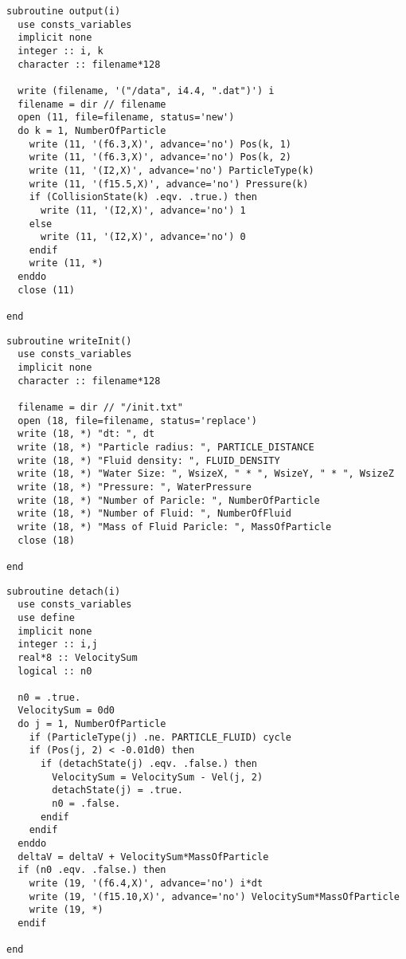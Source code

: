 \begin{lstlisting}[caption=粒子データ出力用ルーチン]
subroutine output(i)
  use consts_variables
  implicit none
  integer :: i, k
  character :: filename*128

  write (filename, '("/data", i4.4, ".dat")') i
  filename = dir // filename
  open (11, file=filename, status='new')
  do k = 1, NumberOfParticle
    write (11, '(f6.3,X)', advance='no') Pos(k, 1)
    write (11, '(f6.3,X)', advance='no') Pos(k, 2)
    write (11, '(I2,X)', advance='no') ParticleType(k)
    write (11, '(f15.5,X)', advance='no') Pressure(k)
    if (CollisionState(k) .eqv. .true.) then
      write (11, '(I2,X)', advance='no') 1
    else
      write (11, '(I2,X)', advance='no') 0
    endif
    write (11, *)
  enddo
  close (11)

end
\end{lstlisting}
\begin{lstlisting}[caption=初期状態出力用ルーチン]
subroutine writeInit()
  use consts_variables
  implicit none
  character :: filename*128

  filename = dir // "/init.txt"
  open (18, file=filename, status='replace')
  write (18, *) "dt: ", dt
  write (18, *) "Particle radius: ", PARTICLE_DISTANCE
  write (18, *) "Fluid density: ", FLUID_DENSITY
  write (18, *) "Water Size: ", WsizeX, " * ", WsizeY, " * ", WsizeZ
  write (18, *) "Pressure: ", WaterPressure
  write (18, *) "Number of Paricle: ", NumberOfParticle
  write (18, *) "Number of Fluid: ", NumberOfFluid
  write (18, *) "Mass of Fluid Paricle: ", MassOfParticle
  close (18)

end
\end{lstlisting}
\begin{lstlisting}[caption=推力・運動量計算用ルーチン]
subroutine detach(i)
  use consts_variables
  use define
  implicit none
  integer :: i,j
  real*8 :: VelocitySum
  logical :: n0

  n0 = .true.
  VelocitySum = 0d0
  do j = 1, NumberOfParticle
    if (ParticleType(j) .ne. PARTICLE_FLUID) cycle
    if (Pos(j, 2) < -0.01d0) then
      if (detachState(j) .eqv. .false.) then
        VelocitySum = VelocitySum - Vel(j, 2)
        detachState(j) = .true.
        n0 = .false.
      endif
    endif
  enddo
  deltaV = deltaV + VelocitySum*MassOfParticle
  if (n0 .eqv. .false.) then
    write (19, '(f6.4,X)', advance='no') i*dt
    write (19, '(f15.10,X)', advance='no') VelocitySum*MassOfParticle
    write (19, *)
  endif

end
\end{lstlisting}